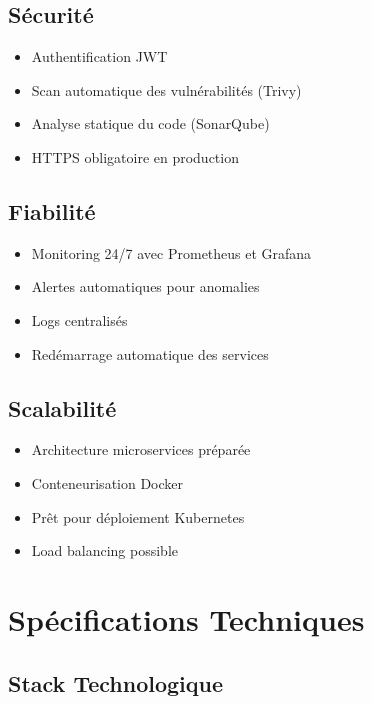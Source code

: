 \documentclass[12pt,a4paper]{report}
\begin{document}
\subsection{Sécurité}
\begin{itemize}
    \item Authentification JWT
    \item Scan automatique des vulnérabilités (Trivy)
    \item Analyse statique du code (SonarQube)
    \item HTTPS obligatoire en production
\end{itemize}

\subsection{Fiabilité}
\begin{itemize}
    \item Monitoring 24/7 avec Prometheus et Grafana
    \item Alertes automatiques pour anomalies
    \item Logs centralisés
    \item Redémarrage automatique des services
\end{itemize}

\subsection{Scalabilité}
\begin{itemize}
    \item Architecture microservices préparée
    \item Conteneurisation Docker
    \item Prêt pour déploiement Kubernetes
    \item Load balancing possible
\end{itemize}

\section{Spécifications Techniques}

\subsection{Stack Technologique}
\end{document}
